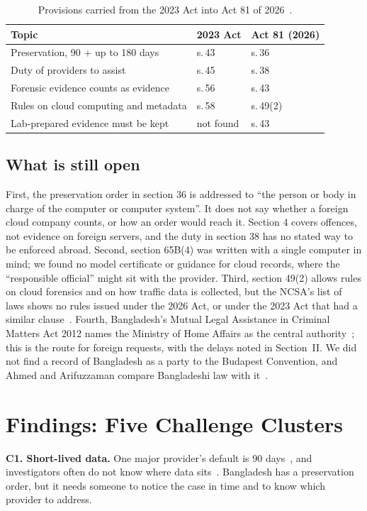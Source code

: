 \documentclass[conference]{IEEEtran}
\begin{document}
\begin{table}[t]
\centering
\caption{Provisions carried from the 2023 Act into Act 81 of 2026~\cite{act2023,cyberact}.}
\label{tab:carry}
\small
\renewcommand{\arraystretch}{1.05}
\begin{tabularx}{\columnwidth}{@{}l l l@{}}
\toprule
Topic & 2023 Act & Act 81 (2026) \\
\midrule
Preservation, 90 + up to 180 days & s.\,43 & s.\,36 \\
Duty of providers to assist & s.\,45 & s.\,38 \\
Forensic evidence counts as evidence & s.\,56 & s.\,43 \\
Rules on cloud computing and metadata & s.\,58 & s.\,49(2) \\
Lab-prepared evidence must be kept & not found & s.\,43 \\
\bottomrule
\end{tabularx}
\end{table}

\subsection{What is still open}
First, the preservation order in section 36 is addressed to ``the person or body in charge of the computer or computer system''. It does not say whether a foreign cloud company counts, or how an order would reach it. Section 4 covers offences, not evidence on foreign servers, and the duty in section 38 has no stated way to be enforced abroad. Second, section 65B(4) was written with a single computer in mind; we found no model certificate or guidance for cloud records, where the ``responsible official'' might sit with the provider. Third, section 49(2) allows rules on cloud forensics and on how traffic data is collected, but the NCSA's list of laws shows no rules issued under the 2026 Act, or under the 2023 Act that had a similar clause~\cite{ncsa}. Fourth, Bangladesh's Mutual Legal Assistance in Criminal Matters Act 2012 names the Ministry of Home Affairs as the central authority~\cite{mha}; this is the route for foreign requests, with the delays noted in Section~II. We did not find a record of Bangladesh as a party to the Budapest Convention, and Ahmed and Arifuzzaman compare Bangladeshi law with it~\cite{ahmed}.

\section{Findings: Five Challenge Clusters}
\textbf{C1. Short-lived data.} One major provider's default is 90 days~\cite{aws}, and investigators often do not know where data sits~\cite{prakash}. Bangladesh has a preservation order, but it needs someone to notice the case in time and to know which provider to address.
\end{document}
